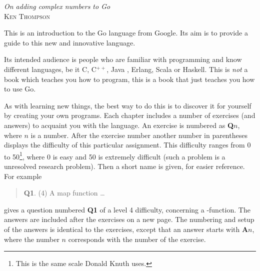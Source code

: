 {\textit{On adding complex numbers to Go}\\ \textsc{Ken Thompson}}

\noindent{}This is an introduction to the Go language from Google. Its aim
is to provide a guide to this new and innovative language. 

Its intended audience is people who are familiar with programming
and know different languages, be it C\cite{c}, C$^{++}$\cite{c++}, 
Java \cite{java}, Erlang\cite{erlang}, Scala\cite{scala} or
Haskell\cite{haskell}. This is \emph{not} a book which teaches you how to 
program, this is a book that just teaches you how to use Go.

As with
learning new things, the best way to do this is to discover it for
yourself by creating your own programs.
Each chapter includes a number of exercises (and answers)
to acquaint you with the language.
An exercise
is numbered as \textbf{Q$n$}, where $n$ is a number. After the
exercise number another number in parentheses displays the difficulty
of this particular assignment. This difficulty ranges from 0 to
50\footnote{This is the same scale Donald Knuth uses.}, where
0 is easy and 50 is extremely difficult (such a problem is a unresolved
research problem). Then a short name is given, for easier reference.
For example
\begin{verse}
\textbf{Q1}. (4) A map function \ldots
\end{verse}
    
gives a question numbered \textbf{Q1} of a level 4 difficulty, concerning a
-function. The answers are included after the exercises on a
new page.
The numbering and setup of the answers is identical to the
exercises, except that an answer starts with \textbf{A$n$}, where the
number $n$ corresponds with the number of the exercise.

